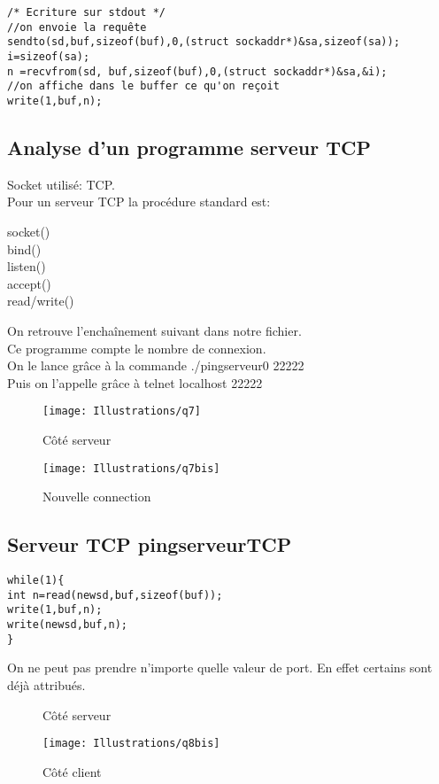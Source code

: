 \documentclass[paper=a4, fontsize=12pt]{article}
\numberwithin{equation}{section}		%
\numberwithin{figure}{section}			%
\numberwithin{table}{section}				%
\begin{document}
\begin{verbatim}
/* Ecriture sur stdout */
//on envoie la requête
sendto(sd,buf,sizeof(buf),0,(struct sockaddr*)&sa,sizeof(sa));
i=sizeof(sa);
n =recvfrom(sd, buf,sizeof(buf),0,(struct sockaddr*)&sa,&i);
//on affiche dans le buffer ce qu'on reçoit
write(1,buf,n);
\end{verbatim}

\subsection{Analyse d'un programme serveur TCP}
Socket utilisé: TCP.\\

Pour un serveur TCP la procédure standard est:
\begin{center}
socket()\\
bind()\\
listen()\\
accept()\\
read/write()\\
\end{center}
On retrouve l'enchaînement suivant dans notre fichier.
\\Ce programme compte le nombre de connexion.\\
On le lance grâce à la commande ./pingserveur0 22222\\
Puis on l'appelle grâce à telnet localhost 22222
\begin{figure}[h!]
\centerline{\texttt{[image: Illustrations/q7]}}
\caption{\label{Illustrations/q7} Côté serveur}
\end{figure}
\begin{figure}[h!]
\centerline{\texttt{[image: Illustrations/q7bis]}}
\caption{\label{Illustrations/q7bis} Nouvelle connection}
\end{figure}
\subsection{Serveur TCP pingserveurTCP}
\begin{verbatim}
while(1){
int n=read(newsd,buf,sizeof(buf));
write(1,buf,n);
write(newsd,buf,n);
}
\end{verbatim}
On ne peut pas prendre n'importe quelle valeur de port. En effet certains sont déjà attribués.

\begin{figure}[h!]
\caption{\label{Illustrations/q8}Côté serveur}
\end{figure}
\newpage%
\begin{figure}[h!]
\centerline{\texttt{[image: Illustrations/q8bis]}}
\caption{\label{Illustrations/q8bis} Côté client}
\end{figure}
\end{document}
